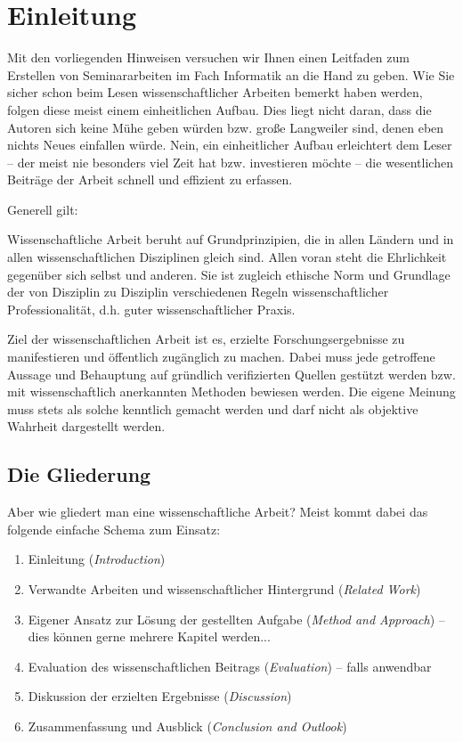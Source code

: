 \section{Einleitung}
\label{sec_einleitung}

\noindent
Mit den vorliegenden Hinweisen versuchen wir Ihnen einen Leitfaden zum Erstellen von Seminararbeiten im Fach Informatik an die Hand zu geben.
Wie Sie sicher schon beim Lesen wissenschaftlicher Arbeiten bemerkt haben werden, folgen diese meist einem einheitlichen Aufbau.
Dies liegt nicht daran, dass die Autoren sich keine Mühe geben würden bzw. große Langweiler sind, denen eben nichts Neues einfallen würde.
Nein, ein einheitlicher Aufbau erleichtert dem Leser -- der meist nie besonders viel Zeit hat bzw. investieren möchte -- die wesentlichen Beiträge der Arbeit schnell und effizient zu erfassen.

\medskip

Generell gilt:
\begin{displayquote}
\glqq Wissenschaftliche Arbeit beruht auf Grundprinzipien, die in allen Ländern und in allen wissenschaftlichen Disziplinen gleich sind. Allen voran steht die Ehrlichkeit gegenüber sich selbst und anderen. Sie ist zugleich ethische Norm und Grundlage der von Disziplin zu Disziplin verschiedenen Regeln wissenschaftlicher Professionalität, d.h. guter wissenschaftlicher Praxis.\grqq \, \cite{dfg:2013}
\end{displayquote}

\medskip

Ziel der wissenschaftlichen Arbeit ist es, erzielte Forschungsergebnisse zu manifestieren und öffentlich zugänglich zu machen. 
Dabei muss jede getroffene Aussage und Behauptung auf gründlich verifizierten Quellen gestützt werden bzw. mit wissenschaftlich anerkannten Methoden bewiesen werden.
Die eigene Meinung muss stets als solche kenntlich gemacht werden und darf nicht als objektive Wahrheit dargestellt werden.

\subsection{Die Gliederung}
Aber wie gliedert man eine wissenschaftliche Arbeit?
Meist kommt dabei das folgende einfache Schema zum Einsatz:
\begin{enumerate}
\item Einleitung (\textit{Introduction})
\item Verwandte Arbeiten und wissenschaftlicher Hintergrund (\textit{Related Work})
\item Eigener Ansatz zur Lösung der gestellten Aufgabe (\textit{Method and Approach}) -- dies können gerne mehrere Kapitel werden...
\item Evaluation des wissenschaftlichen Beitrags (\textit{Evaluation}) -- falls anwendbar
\item Diskussion der erzielten Ergebnisse (\textit{Discussion})
\item Zusammenfassung und Ausblick (\textit{Conclusion and Outlook})
\end{enumerate}


